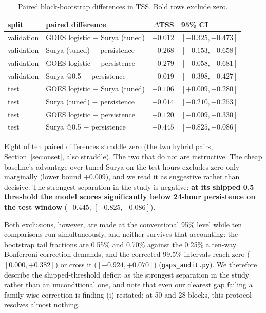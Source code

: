 \documentclass[11pt]{article}
\newcommand{\code}[1]{\texttt{#1}}
\begin{document}
\begin{table}[htbp]
\centering
\caption{Paired block-bootstrap differences in TSS. Bold rows exclude zero.}
\begin{tabular}{llrl}
\toprule
split & paired difference & $\Delta$TSS & 95\% CI \\
\midrule
validation & GOES logistic $-$ Surya (tuned) & $+0.012$ & $[-0.325, +0.473]$ \\
validation & Surya (tuned) $-$ persistence & $+0.268$ & $[-0.153, +0.658]$ \\
validation & GOES logistic $-$ persistence & $+0.279$ & $[-0.058, +0.681]$ \\
validation & Surya @0.5 $-$ persistence & $+0.019$ & $[-0.398, +0.427]$ \\
test & GOES logistic $-$ Surya (tuned) & $\mathbf{+0.106}$ & $\mathbf{[+0.009, +0.280]}$ \\
test & Surya (tuned) $-$ persistence & $+0.014$ & $[-0.210, +0.253]$ \\
test & GOES logistic $-$ persistence & $+0.120$ & $[-0.009, +0.330]$ \\
test & Surya @0.5 $-$ persistence & $\mathbf{-0.445}$ & $\mathbf{[-0.825, -0.086]}$ \\
\bottomrule
\end{tabular}
\end{table}

Eight of ten paired differences straddle zero (the two hybrid pairs,
Section~\ref{sec:onset}, also straddle). The two that do not are instructive.
The cheap baseline's advantage over tuned Surya on the test hours excludes zero
only marginally (lower bound $+0.009$), and we read it as suggestive rather than
decisive. The strongest separation in the study is negative:
\textbf{at its shipped 0.5 threshold the model scores significantly below
24-hour persistence on the test window} ($-0.445$, $[-0.825, -0.086]$).

Both exclusions, however, are made at the conventional 95\% level while ten
comparisons run simultaneously, and neither survives that accounting: the
bootstrap tail fractions are 0.55\% and 0.70\% against the 0.25\% a ten-way
Bonferroni correction demands, and the corrected 99.5\% intervals reach zero
($[0.000, +0.382]$) or cross it ($[-0.924, +0.070]$) (\code{gaps\_audit.py}).
We therefore describe the shipped-threshold deficit as the strongest separation
in the study rather than an unconditional one, and note that even our clearest
gap failing a family-wise correction is finding (i) restated: at 50 and 28
blocks, this protocol resolves almost nothing.
\end{document}

